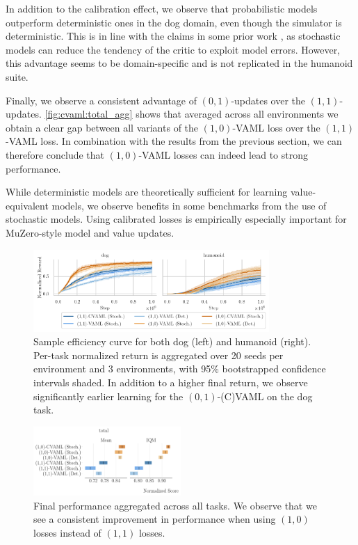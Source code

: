 In addition to the calibration effect, we observe that probabilistic models outperform deterministic ones in the dog domain, even though the simulator is deterministic.
This is in line with the claims in some prior work \parencite{pets,janner2019mbpo}, as stochastic models can reduce the tendency of the critic to exploit model errors.
However, this advantage seems to be domain-specific and is not replicated in the humanoid suite.

Finally, we observe a consistent advantage of $(0,1)$-updates over the $(1,1)$-updates.
\autoref{fig:cvaml:total_agg} shows that averaged across all environments we obtain a clear gap between all variants of the $(1,0)$-VAML loss over the $(1,1)$-VAML loss. 
In combination with the results from the previous section, we can therefore conclude that $(1,0)$-VAML losses can indeed lead to strong performance.

\begin{boxinsight}
While deterministic models are theoretically sufficient for learning value-equivalent models, we observe benefits in some benchmarks from the use of stochastic models.
Using calibrated losses is empirically especially important for MuZero-style model and value updates.
\end{boxinsight}

\begin{figure}[t]
    \centering
    \includegraphics[width=0.8\textwidth]{figures/lambda/plts/reward.pdf} 
    \caption{Sample efficiency curve for both dog (left) and humanoid (right). Per-task normalized return is aggregated over 20 seeds per environment and 3 environments, with 95\% bootstrapped confidence intervals shaded. 
    In addition to a higher final return, we observe significantly earlier learning for the $(0,1)$-(C)VAML on the dog task.}
   \label{fig:cvaml:dmc_reward}
\end{figure}

\begin{figure}[b]
    \centering
    \includegraphics[width=0.5\textwidth]{figures/lambda/plts/agg_total.pdf} 
    \caption{Final performance aggregated across all tasks. We observe that we see a consistent improvement in performance when using $(1,0)$ losses instead of $(1,1)$ losses.}
   \label{fig:cvaml:total_agg}
\end{figure}

